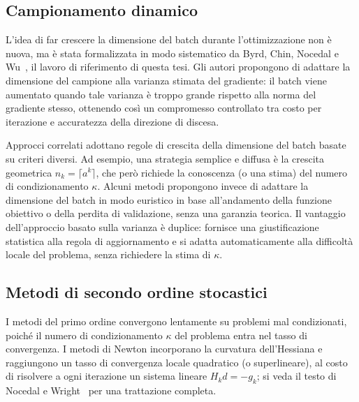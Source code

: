\documentclass[a4paper,12pt]{article}
\numberwithin{equation}{section}
\numberwithin{figure}{section}
\numberwithin{table}{section}
\begin{document}
\subsection{Campionamento dinamico}

L'idea di far crescere la dimensione del batch durante l'ottimizzazione
non è nuova, ma è stata formalizzata in modo sistematico da Byrd, Chin, Nocedal
e Wu~\cite{byrd2012}, il lavoro di riferimento di questa tesi. Gli autori
propongono di adattare la dimensione del campione alla varianza stimata del
gradiente: il batch viene aumentato quando tale varianza è troppo grande
rispetto alla norma del gradiente stesso, ottenendo così un compromesso
controllato tra costo per iterazione e accuratezza della direzione di discesa.

Approcci correlati adottano regole di crescita della dimensione del batch
basate su criteri diversi. Ad esempio, una strategia semplice e diffusa è la
crescita geometrica $n_k = \lceil a^k \rceil$, che però richiede la
conoscenza (o una stima) del numero di condizionamento $\kappa$. Alcuni metodi
propongono invece di adattare la dimensione del batch in modo euristico in base
all'andamento della funzione obiettivo o della perdita di validazione, senza
una garanzia teorica. Il vantaggio dell'approccio basato sulla varianza è
duplice: fornisce una giustificazione statistica alla regola di aggiornamento
e si adatta automaticamente alla difficoltà locale del problema, senza
richiedere la stima di $\kappa$.

\subsection{Metodi di secondo ordine stocastici}

I metodi del primo ordine convergono lentamente su problemi mal condizionati,
poiché il numero di condizionamento $\kappa$ del problema entra nel tasso di
convergenza. I metodi di Newton incorporano la curvatura dell'Hessiana e
raggiungono un tasso di convergenza locale quadratico (o superlineare), al
costo di risolvere a ogni iterazione un sistema lineare
$H_k d = -g_k$; si veda il testo di Nocedal e Wright~\cite{nocedal2006} per
una trattazione completa.
\end{document}
